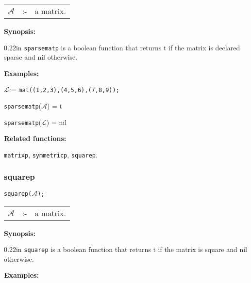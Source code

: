 \hspace*{0.1in}  
\begin{tabular}{l l l} 
$\mathcal{A}$ &:-& a matrix.
\end{tabular}

\textbf{Synopsis:} 

\begin{addtolength}{\leftskip}{0.22in}
\texttt{sparsematp} is a boolean function that returns t if 
                the matrix is declared sparse and nil otherwise.

\end{addtolength}

\textbf{Examples:}

\begin{flushleft}
\hspace*{0.175in}
$\mathcal{L}$:= \texttt{mat((1,2,3),(4,5,6),(7,8,9));}
\end{flushleft}

\vspace*{0.1in}

\hspace*{0.175in} \texttt{sparsematp}($\mathcal{A}$) = t 

\hspace*{0.175in} \texttt{sparsematp}($\mathcal{L}$) = nil

\textbf{Related functions:}

\hspace*{0.175in} \texttt{matrixp}, \texttt{symmetricp}, \texttt{squarep}.


\subsubsection{squarep}

\hspace*{0.175in} \texttt{squarep($\mathcal{A}$);}

\hspace*{0.1in}  
\begin{tabular}{l l l} 
$\mathcal{A}$ &:-& a matrix.
\end{tabular}

\textbf{Synopsis:} 

\begin{addtolength}{\leftskip}{0.22in}
\texttt{squarep} is a boolean function that returns t if 
                the matrix is square and nil otherwise.

\end{addtolength}

\textbf{Examples:}

